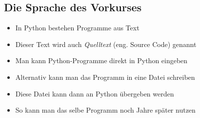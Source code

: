 \subsection{Die Sprache des Vorkurses}
\begin{frame}
    \slidehead
    \begin{itemize}[<+->]
        \item In Python bestehen Programme aus Text
        \item Dieser Text wird auch \emph{Quelltext} (eng. Source Code) genannt
        \item Man kann Python-Programme direkt in Python eingeben
        \item Alternativ kann man das Programm in eine Datei schreiben
        \item Diese Datei kann dann an Python übergeben werden
        \item So kann man das selbe Programm noch Jahre später nutzen
    \end{itemize}
\end{frame}

\livecoding


\subtitle{Kapitel 1: Erste Schritte}


